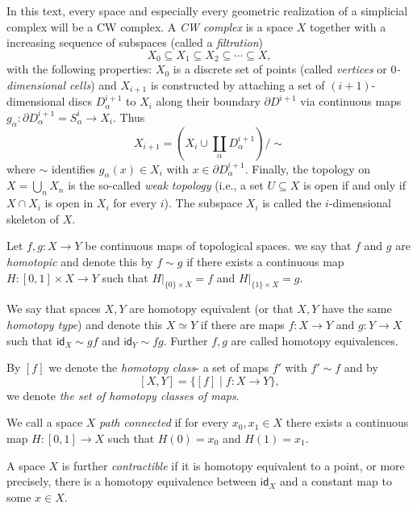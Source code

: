 \documentclass[a4paper, v2021]{lipics-v2021}
\theoremstyle{plain}
\theoremstyle{definition}
\begin{document}
In this text, every space and especially every geometric realization of a simplicial complex will be a CW complex. A \emph{CW complex} is a space $X$ together with a increasing sequence of subspaces (called a \emph{filtration}) 
\[
  X_0 \subseteq X_1 \subseteq X_2 \subseteq \cdots\subseteq X,
\]
with the following properties: $X_0$ is a discrete set of points (called \emph{vertices} or \emph{$0$-dimensional cells}) and $X_{i+1}$ is constructed by attaching a set of $(i+1)$-dimensional discs $D^{i+1}_\alpha$ to $X_i$ along their boundary $\partial D^{i+1}$ via continuous maps $g_\alpha \colon \partial D^{i+1} _\alpha = S^{i} _\alpha \to X_i$. Thus
\[
  X_{i+1} = (X_i \cup \coprod_\alpha D^{i+1}_\alpha) / \sim
\]
where $\sim$ identifies $g_\alpha(x)\in X_i$ with $x\in \partial D^{i+1}_\alpha$. Finally, the topology on $X = \bigcup_n X_n$ is the so-called \emph{weak topology} (i.e., a set $U\subseteq X$ is open if and only if $X\cap X_i$ is open in $X_i$ for every $i$). The subspace $X_i$ is called the $i$-dimensional skeleton of $X$.

\begin{definition}
Let $f,g\colon X \to Y$ be continuous maps of topological spaces. we say that $f$ and $g$ are \emph{homotopic} and denote this by $f \sim g$ if there exists a continuous map $H \colon [0,1] \times X \to Y$ such that $H|_{\{0\}\times X} = f$ and $H|_{\{1\}\times X} = g$.

We say that spaces $X,Y$ are homotopy equivalent (or that $X,Y$ have the same \emph{homotopy type}) and denote this $X \simeq Y$ if there are maps $f\colon X\to Y$ and $g \colon Y \to X$ such that $\mathsf{id}_X \sim gf$ and $\mathsf{id}_Y \sim fg$. Further $f,g$ are called homotopy equivalences. 

By $[f]$ we denote the \emph{homotopy class}- a set of maps $f'$ with $f' \sim f$ and by 
\[[X,Y] = \{[f] \mid f\colon X \to Y\},\] we denote \emph{the set of homotopy classes of maps}.
\end{definition}

We call a space $X$ \emph{path connected} if for every $x_0, x_1 \in X$ there exists a continuous map $H \colon [0,1] \to X$ such that $H(0) = x_0$ and $H(1) = x_1$.

A space $X$ is further \emph{contractible} if it is homotopy equivalent to a point, or more precisely, there is a homotopy equivalence between $\mathsf{id}_X$ and a constant map to some $x\in X$.
\end{document}
